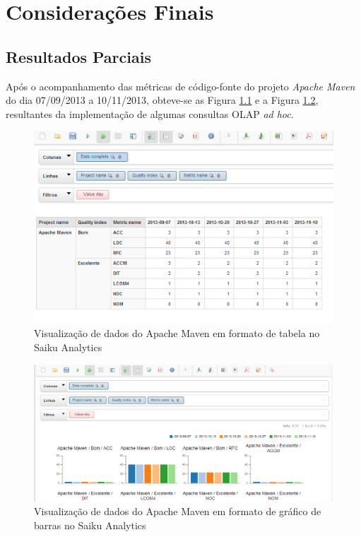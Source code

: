 \chapter{Considerações Finais}


\section{Resultados Parciais}

Após o acompanhamento das métricas de código-fonte do projeto \textit{Apache Maven} do dia 07/09/2013 a 10/11/2013, obteve-se as Figura \ref{table} e a Figura \ref{chart}, resultantes da implementação de algumas consultas OLAP  \textit{ad hoc}.



\begin{figure}[ht!]
\centering
\includegraphics[keepaspectratio=false,scale=0.83]{figuras/indicadores.eps}
\caption{Visualização de dados do Apache Maven em formato de tabela no Saiku Analytics}
\label{table}
\end{figure}
\FloatBarrier
 



\begin{figure}[ht!]
\includegraphics[keepaspectratio=false,scale=0.63]{figuras/indicadores_graficos.eps}
\caption{Visualização de dados do Apache Maven em formato de gráfico de barras no Saiku Analytics}
\label{chart}
\end{figure}
\FloatBarrier


